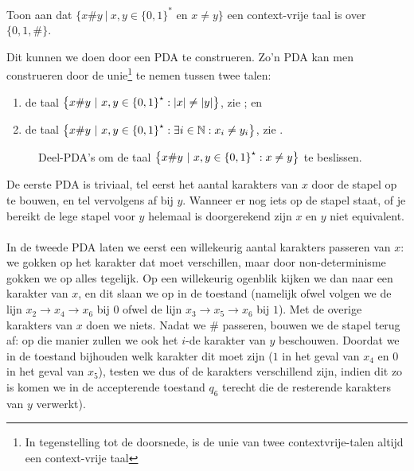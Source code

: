 \documentclass[a4paper]{article}
\begin{document}
\begin{question}
Toon aan dat $\{ x \# y \ | \ \text{$x,y \in \{0,1\}^*$ en $x \neq y$} \}$ een context-vrije taal is over $\{ 0,1,\# \}$.
\begin{answer}
Dit kunnen we doen door een PDA te construeren. Zo'n PDA kan men construeren door de unie\footnote{In tegenstelling tot de doorsnede, is de unie van twee contextvrije-talen altijd een context-vrije taal} te nemen tussen twee talen:
\begin{enumerate}
 \item de taal $\left\{ x\#y\ |\ x,y\in\left\{ 0,1 \right\}^{\star}:\left|x\right|\neq\left|y\right| \right\}$, zie ; en
 \item de taal $\left\{ x\#y\ |\ x,y\in\left\{ 0,1 \right\}^{\star}:\exists i\in\mathbb{N}:x_i\neq y_i \right\}$, zie .
\end{enumerate}
\begin{figure}[hbt]
\centering
{}
\caption{Deel-PDA's om de taal $\left\{ x\#y\ |\ x,y\in\left\{ 0,1 \right\}^{\star}:x\neq y \right\}$ te beslissen.}
\end{figure}
De eerste PDA is triviaal, tel eerst het aantal karakters van $x$ door de stapel op te bouwen, en tel vervolgens af bij $y$. Wanneer er nog iets op de stapel staat, of je bereikt de lege stapel voor $y$ helemaal is doorgerekend zijn $x$ en $y$ niet equivalent.
\paragraph{}
In de tweede PDA laten we eerst een willekeurig aantal karakters passeren van $x$: we gokken op het karakter dat moet verschillen, maar door non-determinisme gokken we op alles tegelijk. Op een willekeurig ogenblik kijken we dan naar een karakter van $x$, en dit slaan we op in de toestand (namelijk ofwel volgen we de lijn $x_2\rightarrow x_4\rightarrow x_6$ bij $0$ ofwel de lijn $x_3\rightarrow x_5\rightarrow x_6$ bij $1$). Met de overige karakters van $x$ doen we niets. Nadat we $\#$ passeren, bouwen we de stapel terug af: op die manier zullen we ook het $i$-de karakter van $y$ beschouwen. Doordat we in de toestand bijhouden welk karakter dit moet zijn ($1$ in het geval van $x_4$ en $0$ in het geval van $x_5$), testen we dus of de karakters verschillend zijn, indien dit zo is komen we in de accepterende toestand $q_6$ terecht die de resterende karakters van $y$ verwerkt).
\end{answer}
\end{question}
\end{document}
